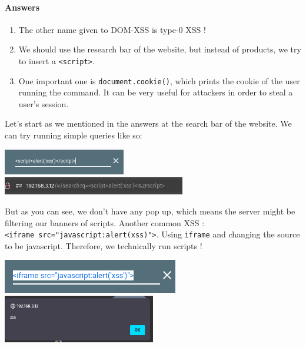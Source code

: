 \documentclass[a4paper,11pt,singlespacing]{article}
\providecommand{\tightlist}{%
  \setlength{\itemsep}{0pt}\setlength{\parskip}{0pt}}
\begin{document}
\newpage

\paragraph{Answers}\label{answers-3}

\begin{enumerate}
\def\labelenumi{\arabic{enumi}.}
\tightlist
\item
  The other name given to DOM-XSS is type-0 XSS !
\item
  We should use the research bar of the website, but instead of
  products, we try to insert a \texttt{\textless{}script\textgreater{}}.
\item
  One important one is \texttt{document.cookie()}, which prints the
  cookie of the user running the command. It can be very useful for
  attackers in order to steal a user's session.
\end{enumerate}

Let's start as we mentioned in the answers at the search bar of the
website. We can try running simple queries like so:

\includegraphics[width=0.4\textwidth,height=0.4\textheight]{Images/Image12.png}
\includegraphics[width=0.6\textwidth,height=0.6\textheight]{Images/Image13.png}

But as you can see, we don't have any pop up, which means the server
might be filtering our banners of scripts. Another common XSS :
\texttt{\textless{}iframe\ src="javascript:alert(\textquotesingle{}xss\textquotesingle{})"\textgreater{}}.
Using \texttt{iframe} and changing the source to be javascript.
Therefore, we technically run scripts !

\includegraphics{Images/Image14.png}\includegraphics[width=0.5\textwidth,height=0.5\textheight]{Images/Image15.png}
\end{document}
